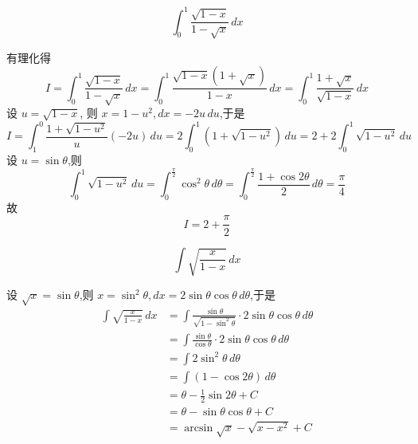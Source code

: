 \begin{questions}
    \question
    \[
    \int_{0}^{1} \frac{\sqrt{1-x}}{1-\sqrt{x}} \, dx
    \]
    \begin{solution}
        有理化得
        \[
        I = \int_{0}^{1} \frac{\sqrt{1-x}}{1-\sqrt{x}} \, dx
        = \int_{0}^{1} \frac{\sqrt{1-x}(1+\sqrt{x})}{1-x} \, dx
        = \int_{0}^{1} \frac{1+\sqrt{x}}{\sqrt{1-x}} \, dx
        \]
        设 $u = \sqrt{1-x}$, 则 $x = 1-u^2, dx = -2u \, du$,于是
        \[
        I = \int_{1}^{0} \frac{1+\sqrt{1-u^2}}{u} (-2u) \, du 
        = 2 \int_{0}^{1} (1 + \sqrt{1-u^2}) \, du 
        = 2 + 2 \int_{0}^{1} \sqrt{1-u^2} \, du
        \]
        设 $u = \sin \theta$,则
        \[
        \int_{0}^{1} \sqrt{1-u^2} \, du = \int_{0}^{\frac{\pi}{2}} \cos^2 \theta \, d\theta = \int_{0}^{\frac{\pi}{2}} \frac{1+\cos 2\theta}{2} \, d\theta = \frac{\pi}{4}
        \]
        故
        \[
        I = 2 + \frac{\pi}{2}
        \]
    \end{solution}

    \question
    \[
    \int \sqrt{\frac{x}{1-x}} \, dx
    \]
    \begin{solution}
        设 $\sqrt{x} = \sin \theta$,则 $x = \sin^2 \theta, dx = 2 \sin \theta \cos \theta \, d\theta$,于是
        \begin{align*}
        \int \sqrt{\frac{x}{1-x}} \, dx &= \int \frac{\sin \theta}{\sqrt{1 - \sin^2 \theta}} \cdot 2 \sin \theta \cos \theta \, d\theta \\
        &= \int \frac{\sin \theta}{\cos \theta} \cdot 2 \sin \theta \cos \theta \, d\theta \\
        &= \int 2 \sin^2 \theta \, d\theta \\
        &= \int (1 - \cos 2\theta) \, d\theta \\
        &= \theta - \frac{1}{2} \sin 2\theta + C \\
        &= \theta - \sin \theta \cos \theta + C \\
        &= \arcsin \sqrt{x} - \sqrt{x-x^2} + C
        \end{align*}
    \end{solution}


\end{questions}
